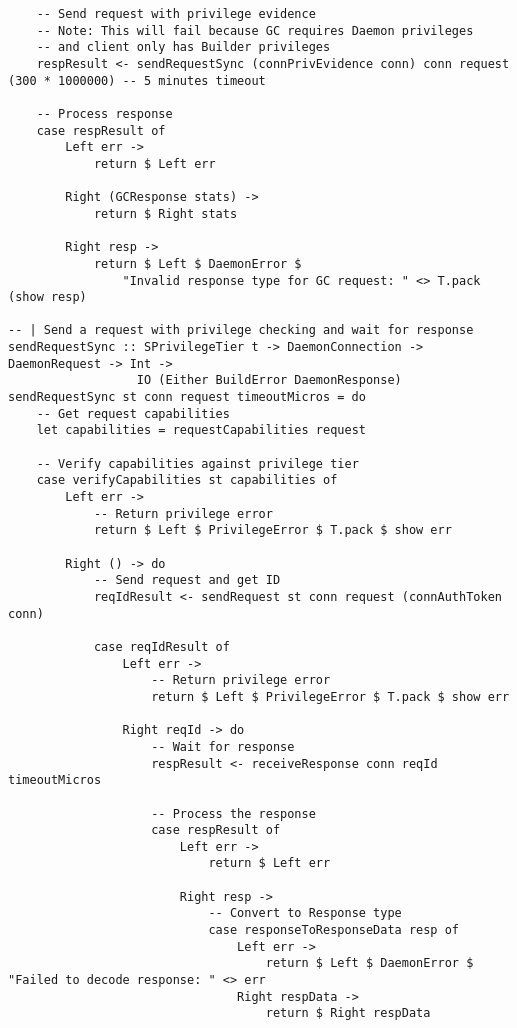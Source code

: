 \documentclass{article}
\begin{document}
\begin{tcolorbox}[title=Ten/Daemon/Client.hs Changes]
\begin{verbatim}
    -- Send request with privilege evidence
    -- Note: This will fail because GC requires Daemon privileges
    -- and client only has Builder privileges
    respResult <- sendRequestSync (connPrivEvidence conn) conn request (300 * 1000000) -- 5 minutes timeout

    -- Process response
    case respResult of
        Left err ->
            return $ Left err

        Right (GCResponse stats) ->
            return $ Right stats

        Right resp ->
            return $ Left $ DaemonError $
                "Invalid response type for GC request: " <> T.pack (show resp)

-- | Send a request with privilege checking and wait for response
sendRequestSync :: SPrivilegeTier t -> DaemonConnection -> DaemonRequest -> Int ->
                  IO (Either BuildError DaemonResponse)
sendRequestSync st conn request timeoutMicros = do
    -- Get request capabilities
    let capabilities = requestCapabilities request

    -- Verify capabilities against privilege tier
    case verifyCapabilities st capabilities of
        Left err ->
            -- Return privilege error
            return $ Left $ PrivilegeError $ T.pack $ show err

        Right () -> do
            -- Send request and get ID
            reqIdResult <- sendRequest st conn request (connAuthToken conn)

            case reqIdResult of
                Left err ->
                    -- Return privilege error
                    return $ Left $ PrivilegeError $ T.pack $ show err

                Right reqId -> do
                    -- Wait for response
                    respResult <- receiveResponse conn reqId timeoutMicros

                    -- Process the response
                    case respResult of
                        Left err ->
                            return $ Left err

                        Right resp ->
                            -- Convert to Response type
                            case responseToResponseData resp of
                                Left err ->
                                    return $ Left $ DaemonError $ "Failed to decode response: " <> err
                                Right respData ->
                                    return $ Right respData


\end{verbatim}
\end{tcolorbox}
\end{document}
